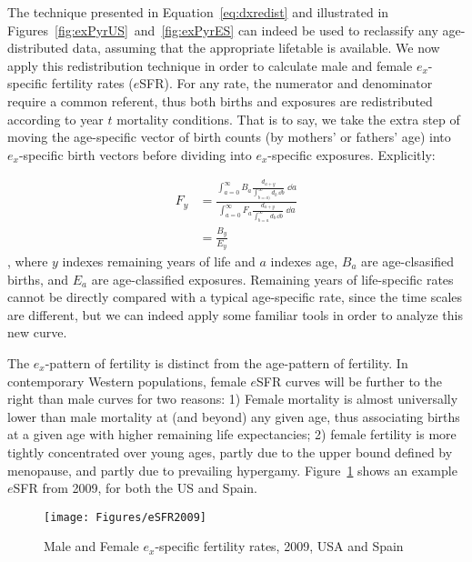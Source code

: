 The technique presented in Equation~\ref{eq:dxredist} and illustrated in
Figures~\ref{fig:exPyrUS}~and~\ref{fig:exPyrES} can indeed be used to reclassify
any age-distributed data, assuming that the appropriate lifetable is available.
We now apply this redistribution technique in order to calculate male and 
female $e_x$-specific fertility rates ($e$SFR). For any rate, the numerator 
and denominator require a common referent, thus both births and exposures are 
redistributed according to year $t$ mortality conditions. That
is to say, we take the extra step of moving the age-specific vector
of birth counts (by mothers' or fathers' age) into $e_x$-specific birth
vectors before dividing into $e_x$-specific exposures. Explicitly:

\begin{align}
\label{eq:eSFR}
F_{y} &= \frac{\int _{a = 0} ^{\infty} B_a \frac{d_{a + y}}{\int _{b = a)}
^{\infty} d_b\, \dd b} \;\dd a}{\int _{a = 0} ^{\infty} F_a \frac{d_{a + y}}{\int _{b = a} ^{\infty} d_b\, \dd b} \;\dd a} \\
 &= \frac{B_{y}}{E_{y}}
\end{align}
, where $y$ indexes remaining years of life and $a$ indexes age, $B_a$ are
age-clsasified births, and $E_a$ are age-classified exposures. Remaining years
of life-specific rates cannot be directly compared with a typical age-specific
rate, since the time scales are different, but we 
can indeed apply some familiar tools in order to analyze this new curve.

The $e_x$-pattern of fertility is distinct from the age-pattern of fertility. 
In contemporary Western populations, female $e$SFR curves will be
further to the right than male curves for two reasons: 1) Female mortality is
almost universally lower than male mortality at (and beyond) any given age,
thus associating births at a given age with higher remaining life expectancies; 2)
female fertility is more tightly concentrated over young ages, partly due to the
upper bound defined by menopause, and partly due to prevailing hypergamy.
Figure~\ref{fig:eSFR2009} shows an example $e$SFR from 2009, for both the US and Spain.

\begin{figure}[ht!]
        \centering  
          \caption{Male and Female $e_x$-specific fertility rates, 2009, USA and
          Spain}
           \texttt{[image: Figures/eSFR2009]}
          \label{fig:eSFR2009}
\end{figure}


